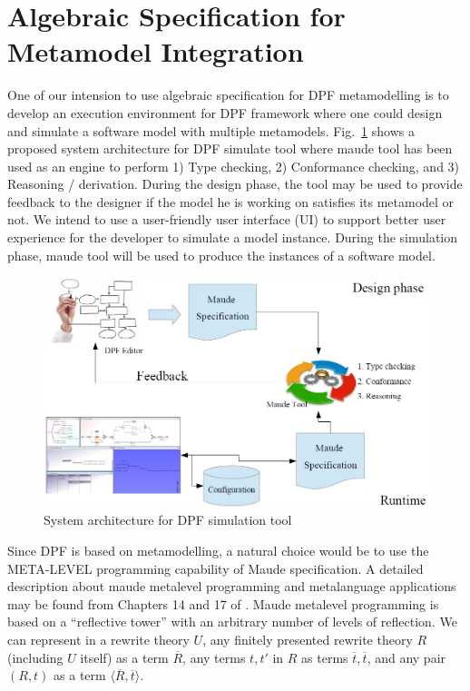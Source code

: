 \documentclass{eceasst}
\begin{document}
 
\section{Algebraic Specification for Metamodel Integration}\label{lbl:algebra}
One of our intension to use algebraic specification for DPF metamodelling is to develop an execution environment for DPF framework where one could design and simulate a software model with 
multiple metamodels. Fig.~\ref{fig:dpfmaude} shows a proposed system architecture for DPF simulate tool where maude tool has been used as an engine to perform 1) Type checking, 2) Conformance checking,
and 3) Reasoning / derivation. During the design phase, the tool may be used to provide feedback to the designer if the model he is working on satisfies its metamodel or not. 
We intend to use a user-friendly user interface (UI) to support better user experience for the developer to simulate a model instance. 
During the simulation phase, maude tool will be used to produce the instances of a software model. 



 
 \begin{figure}[h]
\centering
 \includegraphics[width=\textwidth]{dpfmaude.png}
 \caption{System architecture for DPF simulation tool}
 \label{fig:dpfmaude}
 \end{figure}

Since DPF is based on metamodelling, a natural choice would be to use the META-LEVEL programming capability of Maude specification. 
A detailed description about maude metalevel programming and metalanguage applications may be found from Chapters 14 and 17 of \cite{Clavel2007}. 
Maude metalevel programming is based on a ``reflective tower'' with an arbitrary number of levels of reflection. 
We can represent in a rewrite theory $U$, any finitely presented rewrite theory $R$ (including $U$ itself) as a term $\overline{R}$, any terms $t, t'$ in $R$ as terms $\overline{t}, \overline{t}$, 
and any pair $(R, t)$ as a term $\langle \overline{R}, \overline{t} \rangle$. 
\end{document}
